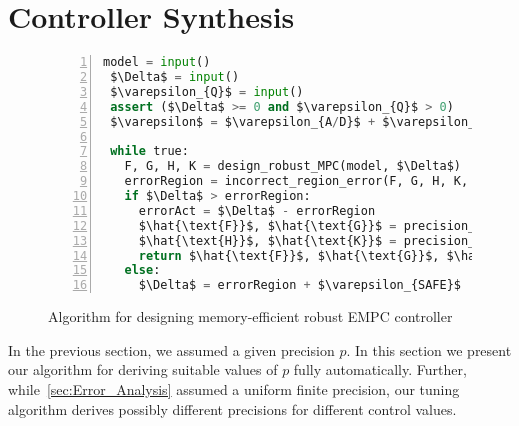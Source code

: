 \section{Controller Synthesis}\label{sec:Controller_Synthesis}

\begin{figure}
\begin{lstlisting}[language=Python,numbers=left,numbersep=3pt,frame=lines,keepspaces=true,mathescape=true,basicstyle=\small\ttfamily]
 model = input() 
 $\Delta$ = input()
 $\varepsilon_{Q}$ = input()
 assert ($\Delta$ >= 0 and $\varepsilon_{Q}$ > 0)
 $\varepsilon$ = $\varepsilon_{A/D}$ + $\varepsilon_{Q}$

 while true:
   F, G, H, K = design_robust_MPC(model, $\Delta$)
   errorRegion = incorrect_region_error(F, G, H, K, $\varepsilon$)
   if $\Delta$ > errorRegion:
     errorAct = $\Delta$ - errorRegion
     $\hat{\text{F}}$, $\hat{\text{G}}$ = precision_tuning(F, G, errorAct)
     $\hat{\text{H}}$, $\hat{\text{K}}$ = precision_tuning(H, K, $\varepsilon_Q$)
     return $\hat{\text{F}}$, $\hat{\text{G}}$, $\hat{\text{H}}$, $\hat{\text{K}}$
   else:
     $\Delta$ = errorRegion + $\varepsilon_{SAFE}$
\end{lstlisting}
\caption{Algorithm for designing memory-efficient robust EMPC controller}
\label{lst:alg}
\end{figure}


In the previous section, we assumed a given precision $p$. In this section we
present our algorithm for deriving suitable values of $p$ fully automatically.
Further, while~\autoref{sec:Error_Analysis} assumed a uniform finite precision,
our tuning algorithm derives possibly different precisions for different control
values.

